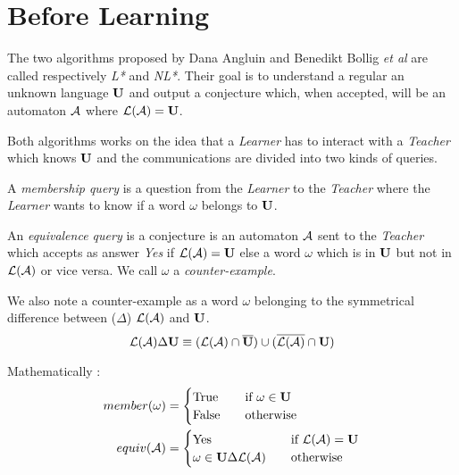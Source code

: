 \section{Before Learning}
The two algorithms proposed by Dana Angluin and Benedikt Bollig \textit{et al} are called respectively \textit{L*} and \textit{NL*}. Their goal is to understand a regular an unknown language $\mathbf{U}$ and output a conjecture which, when accepted, will be an automaton $\mathcal{A}$ where $\mathcal{L}(\mathcal{A}) = \mathbf{U}$.

Both algorithms works on the idea that a \textit{Learner} has to interact with a \textit{Teacher} which knows $\mathbf{U}$ and the communications are divided into two kinds of queries.

\begin{definition}
  A \textit{membership query} is a question from the \textit{Learner} to the \textit{Teacher} where the \textit{Learner} wants to know if a word $\omega$ belongs to $\mathbf{U}$.
\end{definition}

\begin{definition}
  An \textit{equivalence query} is a conjecture is an automaton $\mathcal{A}$ sent to the \textit{Teacher} which accepts as answer \textit{Yes} if $\mathcal{L}(\mathcal{A}) = \mathbf{U}$ else a word $\omega$ which is in $\mathbf{U}$ but not in $\mathcal{L}(\mathcal{A})$ or vice versa. We call $\omega$ a \textit{counter-example}.
\end{definition}

We also note a counter-example as a word $\omega$ belonging to the symmetrical difference between ($\Delta$) $\mathcal{L}(\mathcal{A})$ and $\mathbf{U}$.
\[\mathcal{L}(\mathcal{A}) \Delta \mathbf{U} \equiv (\mathcal{L}(\mathcal{A}) \cap \overline{\mathbf{U}}) \cup (\overline{\mathcal{L}(\mathcal{A})} \cap \mathbf{U})\]

Mathematically :
\begin{align*}
  member(\omega) & =
  \begin{cases}
    \text{True}  & \quad \text{if } \omega \in \mathbf{U} \\
    \text{False} & \quad \text{otherwise}
  \end{cases}
  \\
  equiv(\mathcal{A})      & =
  \begin{cases}
    \text{Yes}               & \quad \text{if } \mathcal{L}(\mathcal{A}) = \mathbf{U} \\
    \omega \in \mathbf{U} \Delta \mathcal{L}(\mathcal{A}) & \quad \text{otherwise}
  \end{cases}
\end{align*}